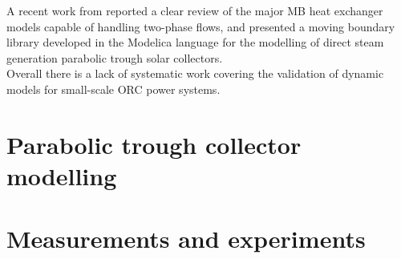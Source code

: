 \documentclass[final,3p,times,review]{elsarticle}
\begin{document}
A recent work from \cite{Bonilla_MB_2015} reported a clear review of the major MB heat exchanger models capable of handling two-phase flows, and presented a moving boundary library developed in the Modelica language for the modelling of direct steam generation parabolic trough solar collectors.\\
Overall there is a lack of systematic work covering the validation of dynamic models for small-scale ORC power systems.
%
\section{Parabolic trough collector modelling}
\label{Sec:DynModel}
%
%
%
\section{Measurements and experiments}
\end{document}

